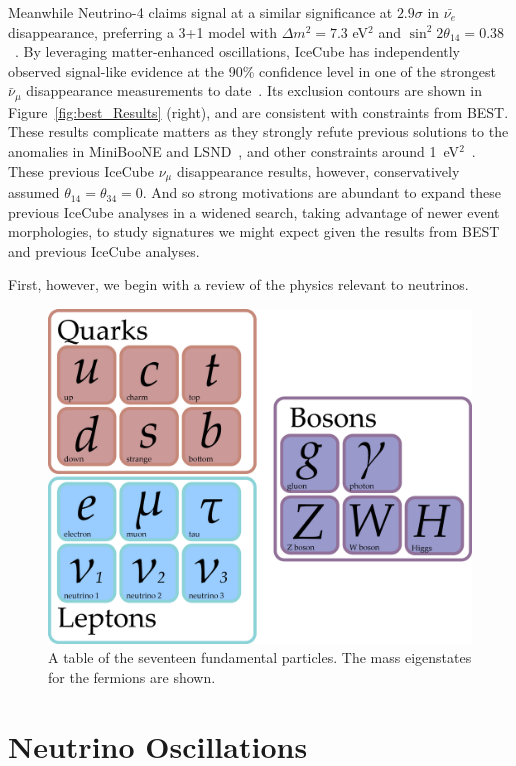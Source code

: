 \documentclass[main.tex]{subfiles}
\begin{document}
Meanwhile Neutrino-4 claims signal at a similar significance at $2.9\sigma$ in $\bar{\nu_{e}}$ disappearance, preferring a 3+1 model with $\Delta m^{2}=7.3$ eV$^{2}$ and $\sin^{2}2\theta_{14}=0.38$~\cite{serebrov2019first}.
By leveraging matter-enhanced oscillations, IceCube has independently observed signal-like evidence at the 90\% confidence level in one of the strongest $\bar{\nu}_{\mu}$ disappearance measurements to date~\cite{Aartsen_2020, Aartsen_2020_prd}.
Its exclusion contours are shown in Figure~\ref{fig:best_Results} (right), and are consistent with constraints from BEST. 
These results complicate matters as they strongly refute previous solutions to the anomalies in MiniBooNE and LSND~\cite{Athanassopoulos_1998}, and other constraints around 1~eV$^{2}$~\cite{kopp2013sterile, Cirelli:2004cz, abazajian2012light, Gariazzo:2017fdh, Dentler:2017tkw, Diaz:2019fwt}.
These previous IceCube $\nu_{\mu}$ disappearance results, however, conservatively assumed $\theta_{14}=\theta_{34}=0$. 
And so strong motivations are abundant to expand these previous IceCube analyses in a widened search, taking advantage of newer event morphologies, to study signatures we might expect given the results from BEST and previous IceCube analyses. 

First, however, we begin with a review of the physics relevant to neutrinos.

\begin{figure}
    \centering
    \includegraphics[width=0.8\linewidth]{figures/particles.png}
    \caption{A table of the seventeen fundamental particles. The mass eigenstates for the fermions are shown.}\label{fig:party}
\end{figure}

\section{Neutrino Oscillations}
\end{document}
